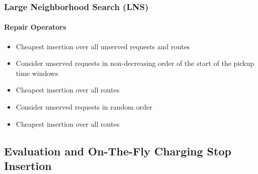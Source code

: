 \documentclass[aspectratio=1610]{beamer}
\begin{document}
\begin{frame}
  \frametitle{Large Neighborhood Search (LNS)}
  \framesubtitle{Repair Operators}
  
\begin{itemize}
	\item Cheapest insertion over all unserved requests and routes 
\end{itemize}

\medskip

\begin{itemize}
	\item Consider unserved requests in non-decreasing order of the start of the pickup time windows 
	\item Cheapest insertion over all routes 
\end{itemize}

\medskip

\begin{itemize}
	\item Consider unserved requests in random order
	\item Cheapest insertion over all routes 
\end{itemize}


\end{frame}


\subsection{Evaluation and On-The-Fly Charging Stop Insertion}
\end{document}
